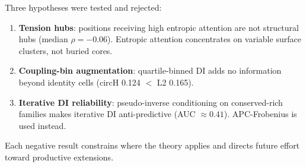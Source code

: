 Three hypotheses were tested and rejected:
\begin{enumerate}[nosep]
	\item \textbf{Tension hubs}: positions receiving high entropic attention are
	      not structural hubs (median $\rho = -0.06$).  Entropic attention
	      concentrates on variable surface clusters, not buried cores.
	\item \textbf{Coupling-bin augmentation}: quartile-binned DI adds no
	      information beyond identity cells (circH 0.124 $<$ L2 0.165).
	\item \textbf{Iterative DI reliability}: pseudo-inverse conditioning on
	      conserved-rich families makes iterative DI anti-predictive
	      (AUC $\approx 0.41$).  APC-Frobenius is used instead.
\end{enumerate}

Each negative result constrains where the theory applies and directs future
effort toward productive extensions.
